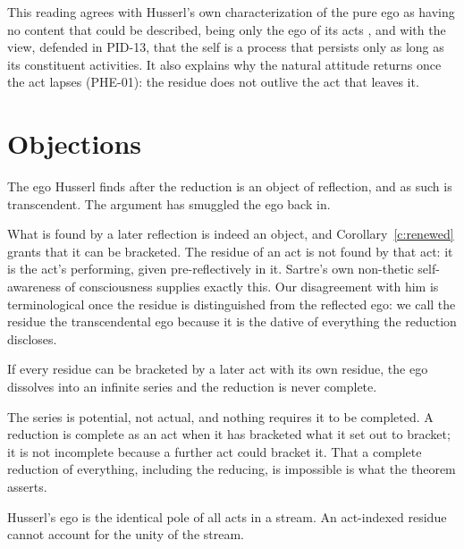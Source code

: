 \documentclass{situationist-preprint}
\begin{document}
This reading agrees with Husserl's own characterization of the pure ego as having no content that could be described, being only the ego of its acts \citep[§80]{Husserl1913}, and with the view, defended in PID-13, that the self is a process that persists only as long as its constituent activities. It also explains why the natural attitude returns once the act lapses (PHE-01): the residue does not outlive the act that leaves it.

\section{Objections}

\begin{objection}[Sartre]
The ego Husserl finds after the reduction is an object of reflection, and as such is transcendent. The argument has smuggled the ego back in.
\end{objection}

\begin{reply}
What is found by a later reflection is indeed an object, and Corollary~\ref{c:renewed} grants that it can be bracketed. The residue of an act is not found by that act: it is the act's performing, given pre-reflectively in it. Sartre's own non-thetic self-awareness of consciousness supplies exactly this. Our disagreement with him is terminological once the residue is distinguished from the reflected ego: we call the residue the transcendental ego because it is the dative of everything the reduction discloses.
\end{reply}

\begin{objection}[Regress]
If every residue can be bracketed by a later act with its own residue, the ego dissolves into an infinite series and the reduction is never complete.
\end{objection}

\begin{reply}
The series is potential, not actual, and nothing requires it to be completed. A reduction is complete as an act when it has bracketed what it set out to bracket; it is not incomplete because a further act could bracket it. That a complete reduction of everything, including the reducing, is impossible is what the theorem asserts.
\end{reply}

\begin{objection}[Unity]
Husserl's ego is the identical pole of all acts in a stream. An act-indexed residue cannot account for the unity of the stream.
\end{objection}
\end{document}
